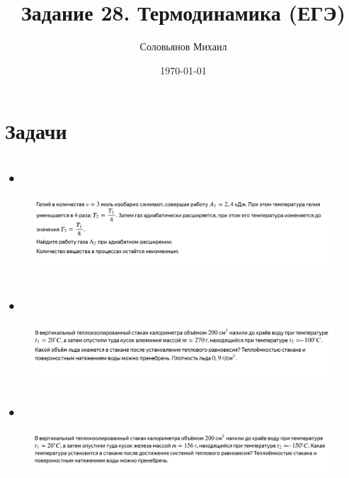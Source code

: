 \documentclass[a4paper,12pt]{article} %
\author{Соловьянов Михаил }
\title{Задание 28. Термодинамика (ЕГЭ)}
\date{\today}
\begin{document}
\maketitle



\section{Задачи}


\subsection{•}

\begin{figure}[H]
\centering
  \includegraphics[width=1.1\linewidth]{1.PNG}
  \label{task0}
\end{figure}

\subsection{•}

\begin{figure}[H]
\centering
  \includegraphics[width=1.1\linewidth]{2.PNG}
  \label{task2}
\end{figure}

\subsection{•}

\begin{figure}[H]
\centering
  \includegraphics[width=1.1\linewidth]{3.PNG}
  \label{task2}
\end{figure}
\end{document}
